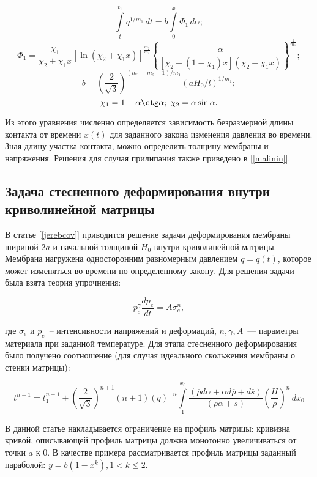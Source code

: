
	$$\int\limits^{t_1}_tq^{1/m_1}\,dt = b\int\limits_0^x\Phi_1\,d\alpha;$$
	$$\Phi_1  = \dfrac{\chi_1}{\chi_2+\chi_1x}[\ln(\chi_2+\chi_1x)]^{\frac{m_2}{m_1}}
	\left\lbrace\dfrac{\alpha}{[\chi_2-(1-\chi_1)x](\chi_2+\chi_1x)}\right\rbrace^\frac{1}{m_1};$$
	$$b = \left(\dfrac{2}{\sqrt 3}\right)^{(m_1+m_2+1)/m_1}(aH_0/l)^{1/m_1};$$
	$$\chi_1=1-\alpha\ctg\alpha;\;\chi_2=\alpha\sin\alpha.$$

Из этого уравнения численно определяется зависимость безразмерной длины контакта от времени $x(t)$ для 
заданного закона изменения давления во времени. Зная длину участка контакта, можно определить толщину 
мембраны и напряжения. Решения для случая прилипания также приведено в [\ref{malinin}].

\subsection{Задача стесненного деформирования внутри криволинейной матрицы}
В статье [\ref{jerebcov}] приводится решение задачи деформирования мембраны шириной $2a$ и начальной толщиной $H_0$ внутри криволинейной матрицы.
Мембрана нагружена односторонним равномерным давлением $q = q(t)$, которое может изменяться во времени по определенному закону.
Для решения задачи была взята теория упрочнения:

\begin{equation}
p^{\gamma}_e\dfrac{dp_e}{dt} = A\sigma_e^n,
\end{equation} 

где $\sigma_e$ и $p_e$~-- интенсивности напряжений и деформаций, $n, \gamma, A$~--- параметры материала при заданной температуре.
Для этапа стесненного деформирования было получено соотношение (для случая идеального скольжения мембраны о стенки матрицы): 

\begin{equation}
t^{n+1} = t_1^{n+1}+\left(\dfrac{2}{\sqrt 3}\right)^{n+1}(n+1)(q)^{-n}\int\limits_1^{x_0}\dfrac{(\overline{\rho} d\alpha + \alpha 
   d\overline{\rho}+d\overline{s})}{(\overline{\rho} \alpha + \overline{s})}\left(\dfrac{H}{\rho}\right)^n\, dx_0
\end{equation}

В данной статье накладывается ограничение на профиль матрицы: кривизна кривой, описывающей профиль
матрицы должна монотонно увеличиваться от точки $a$ к $0$.
 В качестве примера рассматривается профиль матрицы заданный параболой: $y= b(1-x^k), 1<k\leqslant 2$. 

